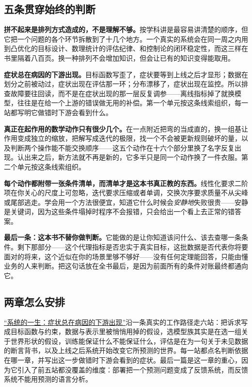 \subsection{五条贯穿始终的判断}

\textbf{拼不起来是排列方式造成的，不是理解不够。}按学科讲是最容易讲清楚的顺序，但它把一个问题的各个环节拆散到了十几个地方。一个真实的系统会在同一周之内用到凸优化的目标设计、数理统计的评估纪律、和控制论的闭环稳定性，而这三样在书里隔着八百页。换一种排列不会增加知识，但会让已有的知识变得能取用。

\textbf{症状总在病因的下游出现。}目标函数写歪了，症状要等到上线之后才显形；数据在划分之前被动过，症状出现在评估那一环；分布漂移了，症状出现在监控。所以排查故障要往回读，而不是在症状出现的那一层反复调参——离线指标掉了就换模型，往往是在给一个上游的错误做无用的补偿。第一个单元按这条线索组织，每一站都写明它做错时下游会看到什么。

\textbf{真正在起作用的数学动作只有很少几个。}在一点附近把弯的当成直的，换一组基让作用变成独立的缩放，把解写成迭代的极限，找一个不会被更新规则破坏的量，以及判断两个操作能不能交换顺序——这五个动作在十六个部分里换了名字反复出现。认出来之后，新方法就不再是新的，它多半只是同一个动作换了一件衣服。第二个单元按这条线索组织。

\textbf{每个动作都附带一张条件清单，而清单才是这本书真正教的东西。}线性化要求二阶项在你关心的尺度上可忽略，迭代要求压缩或者单调，交换次序要求质量不从尖峰或尾部逃走。学会用一个方法很便宜，知道它什么时候会\emph{安静地}失败很贵——安静是关键词，因为这些条件塌掉时程序不会报错，只会给出一个看上去正常的错答案。

\textbf{最后一条：这本书不替你做判断。}它能做的是让你知道该问什么、该去查哪一条条件。剩下那部分——这个代理指标是否忠实于真实目标，这批数据是否代表你将要面对的将来，这个近似在你的场景里够不够好——没有任何定理能回答，只能由懂业务的人来判断。把这句话放在全书最后，是因为前面所有的条件对账最终都通向它。

\subsection{两章怎么安排}

\hyperref[ch:144]{``系统的一生：症状总在病因的下游出现''}沿一条真实的工作路径走六站：把诉求写成目标函数与约束，数据与表示里被悄悄用掉的假设，选模型族其实是在选一组关于世界形状的假设，训练能保证什么不能保证什么，评估是在为一句关于未见数据的断言背书，以及上线之后系统开始改变它所预测的世界。每一站都点名判断依据在哪一章，并写出这一步做错时下游会看到的症状。最后一篇是这一章的重心，因为它引入了前五站都没覆盖的维度：部署把一个预测问题变成了反馈系统，而反馈系统不能用预测的语言分析。

